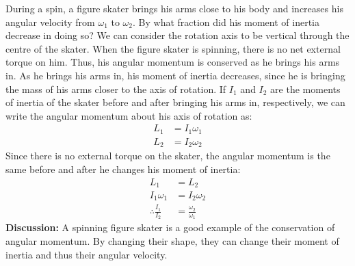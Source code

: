 \begin{example}{During a spin, a figure skater brings his arms close to his body and increases his angular velocity from $\omega_1$ to $\omega_2$. By what fraction did his moment of inertia decrease in doing so?}
We can consider the rotation axis to be vertical through the centre of the skater. When the figure skater is spinning, there is no net external torque on him. Thus, his angular momentum is conserved as he brings his arms in. As he brings his arms in, his moment of inertia decreases, since he is bringing the mass of his arms closer to the axis of rotation. If $I_1$ and $I_2$ are the moments of inertia of the skater before and after bringing his arms in, respectively, we can write the angular momentum about his axis of rotation as:
\begin{align*}
L_1 &= I_1\omega_1\\
L_2 &= I_2\omega_2
\end{align*}
Since there is no external torque on the skater, the angular momentum is the same before and after he changes his moment of inertia:
\begin{align*}
L_1 &= L_2\\
I_1\omega_1 &= I_2\omega_2\\
\therefore \frac{I_1}{I_2} &= \frac{\omega_2}{\omega_1}
\end{align*}
\textbf{Discussion:} A spinning figure skater is a good example of the conservation of angular momentum. By changing their shape, they can change their moment of inertia and thus their angular velocity. 
\end{example}
\vspace{-0.25cm}
